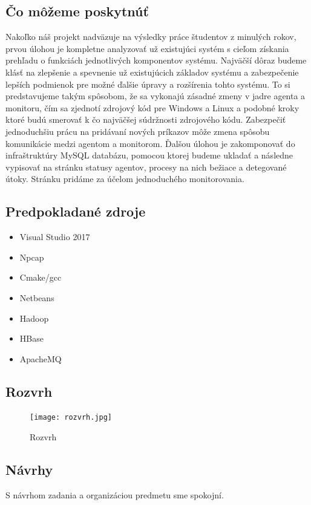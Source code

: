 \documentclass[a4paper,12pt]{article}
\begin{document}
\subsection{Čo môžeme poskytnúť}
Nakoľko náš projekt nadväzuje na výsledky práce študentov z minulých rokov, prvou úlohou  je kompletne analyzovať už existujúci systém s cieľom získania prehľadu o funkciách jednotlivých komponentov systému. Najväčší dôraz budeme klásť na zlepšenie a spevnenie už existujúcich základov systému a zabezpečenie lepších podmienok pre možné ďalšie úpravy a rozšírenia tohto systému. To si predstavujeme takým spôsobom, že sa vykonajú zásadné zmeny v jadre agenta a monitoru, čím sa zjednotí zdrojový kód pre Windows a Linux a podobné kroky ktoré budú smerovať k čo najväčšej súdržnosti zdrojového kódu. Zabezpečiť jednoduchšiu prácu na pridávaní nových príkazov môže zmena spôsobu komunikácie medzi agentom a monitorom. Ďalšou úlohou je zakomponovať do infraštruktúry MySQL databázu, pomocou ktorej budeme ukladať a následne vypisovať na stránku statusy agentov, procesy na nich bežiace a detegované útoky. Stránku pridáme za účelom jednoduchého monitorovania. \\ 

\subsection{Predpokladané zdroje}
\begin{itemize} 
	\item Visual Studio 2017
	\item Npcap
	\item Cmake/gcc
	\item Netbeans
	\item Hadoop 
	\item HBase 
	\item ApacheMQ \\
\end{itemize} 

\subsection{Rozvrh}
\begin{figure}[h!]
	\centering
	\label{graf1}
	\texttt{[image: rozvrh.jpg]}
	\caption{Rozvrh}
\end{figure}

\subsection{Návrhy}
S návrhom zadania a organizáciou predmetu sme spokojní. \\
\newpage
\end{document}
